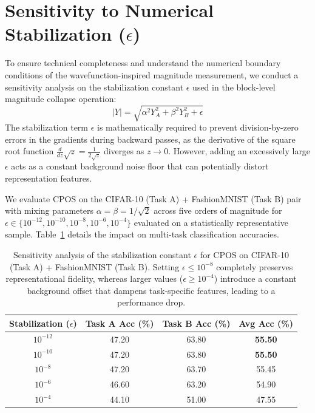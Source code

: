 \documentclass{article}
\theoremstyle{plain}
\theoremstyle{definition}
\theoremstyle{remark}
\begin{document}
\section{Sensitivity to Numerical Stabilization ($\epsilon$)}
\label{subsec:epsilon_sensitivity}
To ensure technical completeness and understand the numerical boundary conditions of the wavefunction-inspired magnitude measurement, we conduct a sensitivity analysis on the stabilization constant $\epsilon$ used in the block-level magnitude collapse operation:
\begin{equation}
|Y| = \sqrt{\alpha^2 Y_A^2 + \beta^2 Y_B^2 + \epsilon}
\end{equation}
The stabilization term $\epsilon$ is mathematically required to prevent division-by-zero errors in the gradients during backward passes, as the derivative of the square root function $\frac{d}{dz}\sqrt{z} = \frac{1}{2\sqrt{z}}$ diverges as $z \to 0$. However, adding an excessively large $\epsilon$ acts as a constant background noise floor that can potentially distort representation features.

We evaluate CPOS on the CIFAR-10 (Task A) + FashionMNIST (Task B) pair with mixing parameters $\alpha = \beta = 1/\sqrt{2}$ across five orders of magnitude for $\epsilon \in \{10^{-12}, 10^{-10}, 10^{-8}, 10^{-6}, 10^{-4}\}$ evaluated on a statistically representative sample. Table~\ref{tab:epsilon_sweep} details the impact on multi-task classification accuracies.

\begin{table}[h]
\caption{Sensitivity analysis of the stabilization constant $\epsilon$ for CPOS on CIFAR-10 (Task A) + FashionMNIST (Task B). Setting $\epsilon \le 10^{-8}$ completely preserves representational fidelity, whereas larger values ($\epsilon \ge 10^{-4}$) introduce a constant background offset that dampens task-specific features, leading to a performance drop.}
\label{tab:epsilon_sweep}
\begin{center}
\begin{small}
\begin{sc}
\begin{tabular}{cccc}
\toprule
Stabilization ($\epsilon$) & Task A Acc (\%) & Task B Acc (\%) & Avg Acc (\%) \\
\midrule
$10^{-12}$ & 47.20 & 63.80 & \textbf{55.50} \\
$10^{-10}$ & 47.20 & 63.80 & \textbf{55.50} \\
$10^{-8}$  & 47.20 & 63.70 & 55.45 \\
$10^{-6}$  & 46.60 & 63.20 & 54.90 \\
$10^{-4}$  & 44.10 & 51.00 & 47.55 \\
\bottomrule
\end{tabular}
\end{sc}
\end{small}
\end{center}
\end{table}
\end{document}

